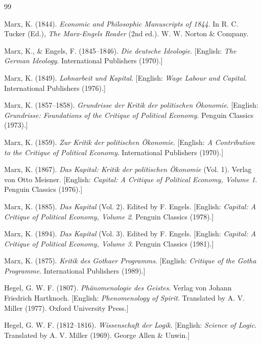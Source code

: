 \documentclass[11pt,a4paper]{article}
\theoremstyle{definition}
\theoremstyle{remark}
\begin{document}
\begin{thebibliography}{99}

Marx, K. (1844). \textit{Economic and Philosophic Manuscripts of 1844}. In R. C. Tucker (Ed.), \textit{The Marx-Engels Reader} (2nd ed.). W. W. Norton \& Company.

Marx, K., \& Engels, F. (1845--1846). \textit{Die deutsche Ideologie}. [English: \textit{The German Ideology}. International Publishers (1970).]

Marx, K. (1849). \textit{Lohnarbeit und Kapital}. [English: \textit{Wage Labour and Capital}. International Publishers (1976).]

Marx, K. (1857--1858). \textit{Grundrisse der Kritik der politischen \"Okonomie}. [English: \textit{Grundrisse: Foundations of the Critique of Political Economy}. Penguin Classics (1973).]

Marx, K. (1859). \textit{Zur Kritik der politischen \"Okonomie}. [English: \textit{A Contribution to the Critique of Political Economy}. International Publishers (1970).]

Marx, K. (1867). \textit{Das Kapital: Kritik der politischen \"Okonomie} (Vol. 1). Verlag von Otto Meisner. [English: \textit{Capital: A Critique of Political Economy, Volume 1}. Penguin Classics (1976).]

Marx, K. (1885). \textit{Das Kapital} (Vol. 2). Edited by F. Engels. [English: \textit{Capital: A Critique of Political Economy, Volume 2}. Penguin Classics (1978).]

Marx, K. (1894). \textit{Das Kapital} (Vol. 3). Edited by F. Engels. [English: \textit{Capital: A Critique of Political Economy, Volume 3}. Penguin Classics (1981).]

Marx, K. (1875). \textit{Kritik des Gothaer Programms}. [English: \textit{Critique of the Gotha Programme}. International Publishers (1989).]

Hegel, G. W. F. (1807). \textit{Ph\"anomenologie des Geistes}. Verlag von Johann Friedrich Hartknoch. [English: \textit{Phenomenology of Spirit}. Translated by A. V. Miller (1977). Oxford University Press.]

Hegel, G. W. F. (1812--1816). \textit{Wissenschaft der Logik}. [English: \textit{Science of Logic}. Translated by A. V. Miller (1969). George Allen \& Unwin.]


\end{thebibliography}
\end{document}

